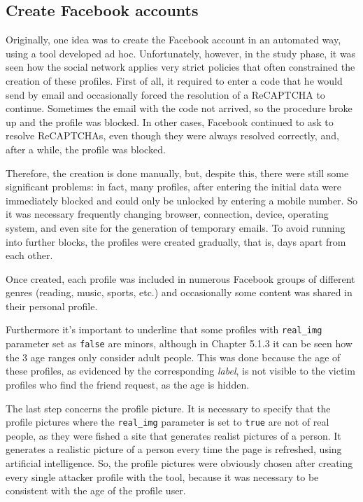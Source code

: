 \subsection{Create Facebook accounts}
Originally, one idea was to create the Facebook account in an automated way, using a tool developed ad hoc. Unfortunately, however, in the study phase, it was seen how the social network applies very strict policies that often constrained the creation of these profiles. First of all, it required to enter a code that he would send by email and occasionally forced the resolution of a ReCAPTCHA to continue. Sometimes the email with the code not arrived, so the procedure broke up and the profile was blocked. In other cases, Facebook continued to ask to resolve ReCAPTCHAs, even though they were always resolved correctly, and, after a while, the profile was blocked.
\par \noindent Therefore, the creation is done manually, but, despite this, there were still some significant problems: in fact, many profiles, after entering the initial data were immediately blocked and could only be unlocked by entering a mobile number. So it was necessary frequently changing browser, connection, device, operating system, and even site for the generation of temporary emails. To avoid running into further blocks, the profiles were created gradually, that is, days apart from each other.
\par \noindent Once created, each profile was included in numerous Facebook groups of different genres (reading, music, sports, etc.) and occasionally some content was shared in their personal profile.
\par \noindent Furthermore it's important to underline that some profiles with \texttt{real\_img} parameter set as \texttt{false} are minors, although in Chapter 5.1.3 it can be seen how the 3 age ranges only consider adult people. This was done because the age of these profiles, as evidenced by the corresponding \textit{label}, is not visible to the victim profiles who find the friend request, as the age is hidden.
\par \noindent The last step concerns the profile picture. It is necessary to specify that the profile pictures where the \texttt{real\_img} parameter is set to \texttt{true} are not of real people, as they were fished a site that generates realist pictures of a person\parencite{site:fake-img}. It generates a realistic picture of a person every time the page is refreshed, using artificial intelligence. So, the profile pictures were obviously chosen after creating every single attacker profile with the tool, because it was necessary to be consistent with the age of the profile user.
